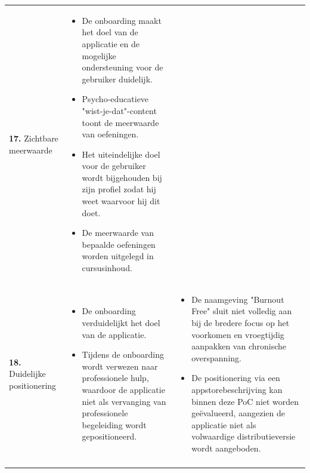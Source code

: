 {\begin{longtable}{
            >{\raggedright\arraybackslash}p{5.23cm}
            >{\raggedright\arraybackslash}p{4.93cm}
            >{\raggedright\arraybackslash}p{4.93cm}
        }
        \addlinespace[5pt]
        
        \textbf{17.} Zichtbare meerwaarde
        &  
        \begin{itemize}[nosep,leftmargin=*,itemsep=10pt] 
            \renewcommand{\labelitemi}{+} 
            \item De onboarding maakt het doel van de applicatie en de mogelijke ondersteuning voor de gebruiker duidelijk.
            \item Psycho-educatieve "wist-je-dat"-content toont de meerwaarde van oefeningen.
            \item Het uiteindelijke doel voor de gebruiker wordt bijgehouden bij zijn profiel zodat hij weet waarvoor hij dit doet.
            \item De meerwaarde van bepaalde oefeningen worden uitgelegd in cursusinhoud.
        \end{itemize} 
        &
        \\
        
        \addlinespace[5pt]
        
        \textbf{18.} Duidelijke positionering 
        &  
        \begin{itemize}[nosep,leftmargin=*,itemsep=10pt] 
            \renewcommand{\labelitemi}{+} 
            \item De onboarding verduidelijkt het doel van de applicatie.
            \item Tijdens de onboarding wordt verwezen naar professionele hulp, waardoor de applicatie niet als vervanging van professionele begeleiding wordt gepositioneerd.
        \end{itemize} 
        &  
        \begin{itemize}[nosep,leftmargin=*,itemsep=10pt] 
            \renewcommand{\labelitemi}{-} 
            \item De naamgeving "Burnout Free" sluit niet volledig aan bij de bredere focus op het voorkomen en vroegtijdig aanpakken van chronische overspanning.
            \item De positionering via een appstorebeschrijving kan binnen deze PoC niet worden geëvalueerd, aangezien de applicatie niet als volwaardige distributieversie wordt aangeboden.
        \end{itemize} 
        \\
        
        \addlinespace[5pt]
        

\end{longtable}}
